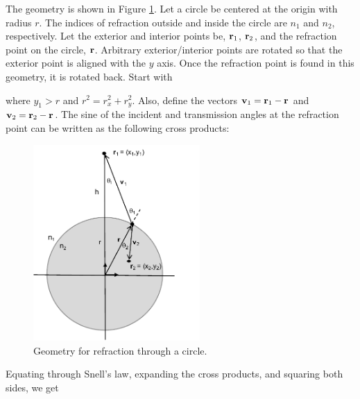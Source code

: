 The geometry is shown in Figure \ref{refractthroughcircle}. Let a circle be centered at the origin with radius $r$. The indices of refraction outside and inside the circle are $n_1$ and $n_2$, respectively. Let the exterior and interior points be, $\mathbf{r}_1$, $\mathbf{r}_2$, and the refraction point on the circle, $\mathbf{r}$.  Arbitrary  exterior/interior points are rotated so that the exterior point is aligned with the $y$ axis. Once the refraction point is found in this geometry, it is rotated back. Start with 

\noindent where $y_1 > r$ and $r^2 = r_x^2 + r_y^2$.  Also, define the vectors $\mathbf{v}_1 = \mathbf{r}_1 - \mathbf{r}$ and $\mathbf{v}_2 = \mathbf{r}_2 - \mathbf{r}$.  The sine of the incident and transmission angles at the refraction point can be written as the following cross products:

\begin{figure}[h] 
   \centering
   \includegraphics[width=2.5in]{ReflectionRefraction/Figures/refractionCircle} 
   \caption{Geometry for refraction through a circle. }
   \label{refractthroughcircle}
\end{figure}

Equating through Snell's law, expanding the cross products, and squaring both sides, we get 

